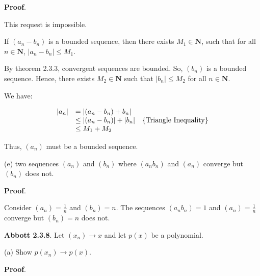 \documentclass[10pt]{article}
\begin{document}
\textbf{Proof}.



This request is impossible. 



If $\displaystyle ( a_{n} -b_{n})$ is a bounded sequence, then there exists $\displaystyle M_{1} \in \mathbf{N}$, such that for all $\displaystyle n\in \mathbf{N}$, $\displaystyle |a_{n} -b_{n} |\leq M_{1}$.



By theorem 2.3.3, convergent sequences are bounded. So, $\displaystyle ( b_{n})$ is a bounded sequence. Hence, there exists $\displaystyle M_{2} \in \mathbf{N}$ such that $\displaystyle |b_{n} |\leq M_{2}$ for all $\displaystyle n\in \mathbf{N}$.



We have:


\begin{equation*}
\begin{array}{ c l c }
|a_{n} | & =|( a_{n} -b_{n}) +b_{n} | & \\
 & \leq |( a_{n} -b_{n}) |+|b_{n} | & \left\{\text{Triangle Inequality}\right\}\\
 & \leq M_{1} +M_{2} & 
\end{array}
\end{equation*}


Thus, $\displaystyle ( a_{n})$ must be a bounded sequence.



(e) two sequences $\displaystyle ( a_{n})$ and $\displaystyle ( b_{n})$ where $\displaystyle ( a_{n} b_{n})$ and $\displaystyle ( a_{n})$ converge but $\displaystyle ( b_{n})$ does not.



\textbf{Proof}.



Consider $\displaystyle ( a_{n}) =\frac{1}{n}$ and $\displaystyle ( b_{n}) =n$. The sequences $\displaystyle ( a_{n} b_{n}) =1$ and $\displaystyle ( a_{n}) =\frac{1}{n}$ converge but $\displaystyle ( b_{n}) =n$ does not.



\textbf{Abbott 2.3.8}. Let $\displaystyle ( x_{n})\rightarrow x$ and let $\displaystyle p( x)$ be a polynomial.



(a) Show $\displaystyle p( x_{n})\rightarrow p( x)$.



\textbf{Proof}.
\end{document}
